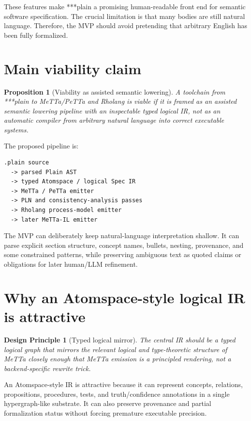 \documentclass[11pt]{article}
\newtheorem{designprinciple}{Design Principle}
\newtheorem{proposition}{Proposition}
\begin{document}
These features make ***plain a promising human-readable front end for semantic
software specification.  The crucial limitation is that many bodies are still
natural language.  Therefore, the MVP should avoid pretending that arbitrary
English has been fully formalized.

\section{Main viability claim}

\begin{proposition}[Viability as assisted semantic lowering]
A toolchain from ***plain to MeTTa/PeTTa and Rholang is viable if it is framed as
an assisted semantic lowering pipeline with an inspectable typed logical IR, not
as an automatic compiler from arbitrary natural language into correct executable
systems.
\end{proposition}

The proposed pipeline is:
\begin{verbatim}
.plain source
  -> parsed Plain AST
  -> typed Atomspace / logical Spec IR
  -> MeTTa / PeTTa emitter
  -> PLN and consistency-analysis passes
  -> Rholang process-model emitter
  -> later MeTTa-IL emitter
\end{verbatim}

The MVP can deliberately keep natural-language interpretation shallow.  It can
parse explicit section structure, concept names, bullets, nesting, provenance,
and some constrained patterns, while preserving ambiguous text as quoted claims
or obligations for later human/LLM refinement.

\section{Why an Atomspace-style logical IR is attractive}

\begin{designprinciple}[Typed logical mirror]
The central IR should be a typed logical graph that mirrors the relevant logical
and type-theoretic structure of MeTTa closely enough that MeTTa emission is a
principled rendering, not a backend-specific rewrite trick.
\end{designprinciple}

An Atomspace-style IR is attractive because it can represent concepts,
relations, propositions, procedures, tests, and truth/confidence annotations in a
single hypergraph-like substrate.  It can also preserve provenance and partial
formalization status without forcing premature executable precision.
\end{document}
